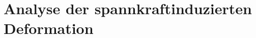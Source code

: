 \documentclass[../main.tex]{subfiles}
\begin{document}
\section{Analyse der spannkraftinduzierten Deformation}
\end{document}
